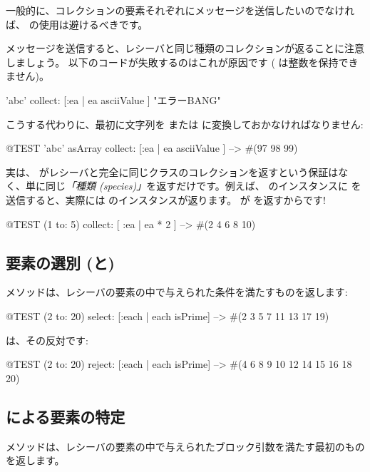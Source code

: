 \documentclass[a4paper,10pt,twoside]{book}
\begin{document}
一般的に、コレクションの要素それぞれにメッセージを送信したいのでなければ、 の使用は避けるべきです。

 メッセージを送信すると、レシーバと同じ種類のコレクションが返ることに注意しましょう。
以下のコードが失敗するのはこれが原因です
( は整数を保持できません)。
\begin{code}{}
'abc' collect: [:ea | ea asciiValue ]      "エラーBANG"
\end{code}
\noindent
こうする代わりに、最初に文字列を  または  に変換しておかなければなりません:
\begin{code}{@TEST}
'abc' asArray collect: [:ea | ea asciiValue ] --> #(97 98 99)
\end{code}

実は、 がレシーバと完全に同じクラスのコレクションを返すという保証はなく、単に同じ\emph{「種類 (species)」}を返すだけです。例えば、 のインスタンスに  を送信すると、実際には  のインスタンスが返ります。 が  を返すからです!
\begin{code}{@TEST}
(1 to: 5) collect: [ :ea | ea * 2 ] --> #(2 4 6 8 10)
\end{code}

\subsection{要素の選別 (と)}

 メソッドは、レシーバの要素の中で与えられた条件を満たすものを返します:

\begin{code}{@TEST}
(2 to: 20) select: [:each | each isPrime] --> #(2 3 5 7 11 13 17 19)
\end{code}

 は、その反対です:
\begin{code}{@TEST}
(2 to: 20) reject: [:each | each isPrime] --> #(4 6 8 9 10 12 14 15 16 18 20)
\end{code}

\subsection{ による要素の特定}
 メソッドは、レシーバの要素の中で与えられたブロック引数を満たす最初のものを返します。
\end{document}
